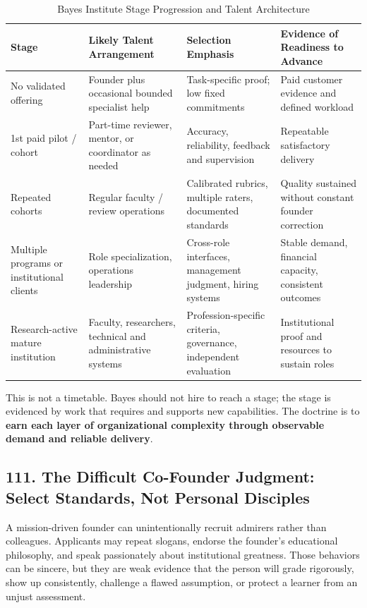 \begin{table}[t]
\centering
\small
\caption{Bayes Institute Stage Progression and Talent Architecture}
\label{tab:bayes_stage_progression}
\begin{tabularx}{\textwidth}{p{3.2cm} p{4.2cm} p{4.2cm} X}
\toprule
\textbf{Stage} & \textbf{Likely Talent Arrangement} & \textbf{Selection Emphasis} & \textbf{Evidence of Readiness to Advance} \\
\midrule
No validated offering & Founder plus occasional bounded specialist help & Task-specific proof; low fixed commitments & Paid customer evidence and defined workload \\
1st paid pilot / cohort & Part-time reviewer, mentor, or coordinator as needed & Accuracy, reliability, feedback and supervision & Repeatable satisfactory delivery \\
Repeated cohorts & Regular faculty / review operations & Calibrated rubrics, multiple raters, documented standards & Quality sustained without constant founder correction \\
Multiple programs or institutional clients & Role specialization, operations leadership & Cross-role interfaces, management judgment, hiring systems & Stable demand, financial capacity, consistent outcomes \\
Research-active mature institution & Faculty, researchers, technical and administrative systems & Profession-specific criteria, governance, independent evaluation & Institutional proof and resources to sustain roles \\
\bottomrule
\end{tabularx}
\end{table}

This is not a timetable. Bayes should not hire to reach a stage; the stage is evidenced by work that requires and supports new capabilities. The doctrine is to \textbf{earn each layer of organizational complexity through observable demand and reliable delivery}.

\subsection*{111. The Difficult Co-Founder Judgment: Select Standards, Not Personal Disciples}

A mission-driven founder can unintentionally recruit admirers rather than colleagues. Applicants may repeat slogans, endorse the founder's educational philosophy, and speak passionately about institutional greatness. Those behaviors can be sincere, but they are weak evidence that the person will grade rigorously, show up consistently, challenge a flawed assumption, or protect a learner from an unjust assessment.


